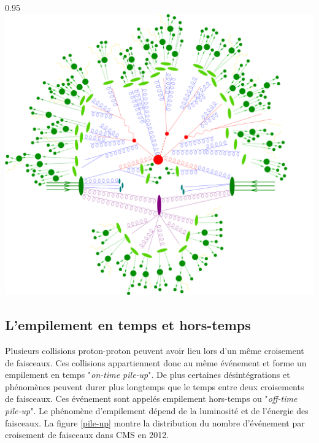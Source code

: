\begin{minipagewithmarginpars}[ht!]{0.95\textwidth}
	\centering
	\includegraphics[width=1.0\textwidth]{LHC/event.jpg}
	\label{collision2}	
\end{minipagewithmarginpars}

\subsection{L'empilement en temps et hors-temps}
Plusieurs collisions proton-proton peuvent avoir lieu lors d'un même croisement de faisceaux. Ces collisions appartiennent donc au même événement et forme un empilement en temps "\textit{on-time pile-up}". De plus certaines désintégrations et phénomènes peuvent durer plus longtemps que le temps entre deux croisements de faisceaux. Ces événement sont appelés empilement hors-temps ou "\textit{off-time pile-up}". Le phénomène d'empilement dépend de la luminosité et de l'énergie des faisceaux. La figure \ref{pile-up} montre la distribution du nombre d'événement par croisement de faisceaux dans CMS en \num{2012}.

